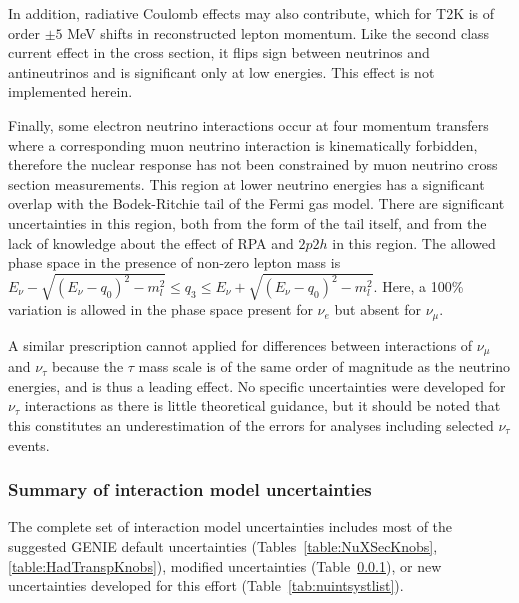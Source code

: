 In addition, radiative Coulomb effects may also contribute, which for T2K is of order $\pm5$ MeV shifts in reconstructed lepton momentum.  Like the second class current effect in the cross section, it flips sign between neutrinos and antineutrinos and is significant only at low energies.  This effect is not implemented herein.

Finally, some electron neutrino interactions occur at four momentum transfers where a corresponding muon neutrino interaction is kinematically forbidden, therefore the nuclear response has not been constrained by muon neutrino cross section measurements.  This region at lower neutrino energies has a significant overlap with the Bodek-Ritchie tail of the Fermi gas model. There are significant uncertainties in this region, both from the form of the tail itself, and from the lack of knowledge about the effect of RPA and $2p2h$ in this region. The allowed phase space in the presence of non-zero lepton mass is $E_\nu-\sqrt{\left( E_\nu-q_0\right) ^2-m_l^2}\leq q_3\leq E_\nu+\sqrt{\left( E_\nu-q_0\right) ^2-m_l^2}$. Here, a 100\% variation is allowed in the phase space present for $\nu_e$ but absent for $\nu_\mu$.

A similar prescription cannot applied for differences between interactions of $\nu_\mu$ and $\nu_\tau$ because the $\tau$ mass scale is of the same order of magnitude as the neutrino energies, and is thus a leading effect. No specific uncertainties were developed for $\nu_\tau$ interactions as there is little theoretical guidance, but it should be noted that this constitutes an underestimation of the errors for analyses including selected $\nu_\tau$ events.

\subsubsection{Summary of interaction model uncertainties}

The complete set of interaction model uncertainties includes most of the suggested GENIE default uncertainties (Tables~\ref{table:NuXSecKnobs}, %
\ref{table:HadTranspKnobs}),  modified uncertainties (Table~\ref{}), or new uncertainties developed for this effort (Table~\ref{tab:nuintsystlist}).

